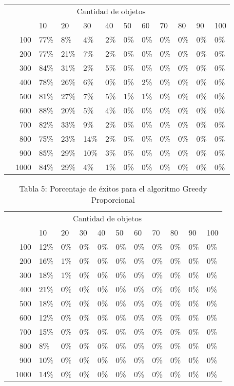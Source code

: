 \documentclass{article}
\begin{document}
\begin{center}
\begin{table}[ht]
\begin{tabularx}{0.8\textwidth}{Xr|XXXXXXXXXX}
&\multicolumn{10}{c}{Cantidad de objetos} \\
&&10&20&30&40&50&60&70&80&90&100\\\hline
\parbox[t]{2mm}{}&100&77\%&8\%&4\%&2\%&0\%&0\%&0\%&0\%&0\%&0\%\\
&200&77\%&21\%&7\%&2\%&0\%&0\%&0\%&0\%&0\%&0\%\\
&300&84\%&31\%&2\%&5\%&0\%&0\%&0\%&0\%&0\%&0\%\\
&400&78\%&26\%&6\%&0\%&0\%&2\%&0\%&0\%&0\%&0\%\\
&500&81\%&27\%&7\%&5\%&1\%&1\%&0\%&0\%&0\%&0\%\\
&600&88\%&20\%&5\%&4\%&0\%&0\%&0\%&0\%&0\%&0\%\\
&700&82\%&33\%&9\%&2\%&0\%&0\%&0\%&0\%&0\%&0\%\\
&800&75\%&23\%&14\%&2\%&0\%&0\%&0\%&0\%&0\%&0\%\\
&900&85\%&29\%&10\%&3\%&0\%&0\%&0\%&0\%&0\%&0\%\\
&1000&84\%&29\%&4\%&1\%&0\%&0\%&0\%&0\%&0\%&0\%\\
\end{tabularx}
\end{table}
\begin{table}[ht]
\centering
\caption*{Tabla 5: Porcentaje de éxitos para el algoritmo Greedy Proporcional}
\label{5}
\begin{tabularx}{0.8\textwidth}{Xr|XXXXXXXXXX}
&\multicolumn{10}{c}{Cantidad de objetos} \\
&&10&20&30&40&50&60&70&80&90&100\\\hline
\parbox[t]{2mm}{}&100&12\%&0\%&0\%&0\%&0\%&0\%&0\%&0\%&0\%&0\%\\
&200&16\%&1\%&0\%&0\%&0\%&0\%&0\%&0\%&0\%&0\%\\
&300&18\%&1\%&0\%&0\%&0\%&0\%&0\%&0\%&0\%&0\%\\
&400&21\%&0\%&0\%&0\%&0\%&0\%&0\%&0\%&0\%&0\%\\
&500&18\%&0\%&0\%&0\%&0\%&0\%&0\%&0\%&0\%&0\%\\
&600&12\%&0\%&0\%&0\%&0\%&0\%&0\%&0\%&0\%&0\%\\
&700&15\%&0\%&0\%&0\%&0\%&0\%&0\%&0\%&0\%&0\%\\
&800&8\%&0\%&0\%&0\%&0\%&0\%&0\%&0\%&0\%&0\%\\
&900&10\%&0\%&0\%&0\%&0\%&0\%&0\%&0\%&0\%&0\%\\
&1000&14\%&0\%&0\%&0\%&0\%&0\%&0\%&0\%&0\%&0\%\\
\end{tabularx}
\end{table}
\end{center}
\end{document}
